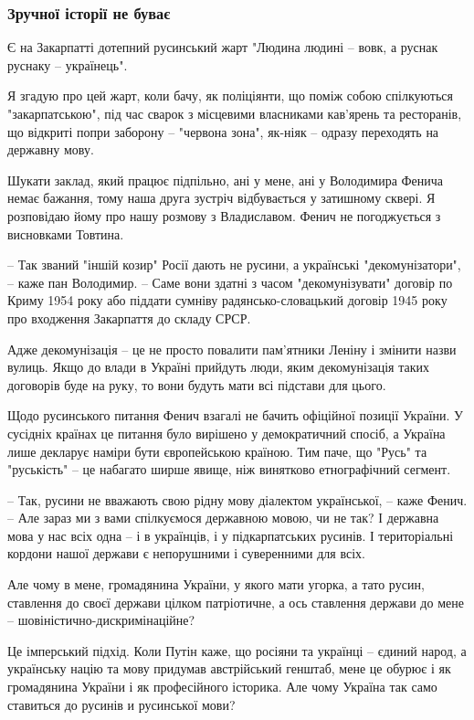 \subsubsection{Зручної історії не буває}

Є на Закарпатті дотепний русинський жарт "Людина людині – вовк, а руснак
руснаку – українець".

Я згадую про цей жарт, коли бачу, як поліціянти, що поміж собою спілкуються
"закарпатською", під час сварок з місцевими власниками кав’ярень та ресторанів,
що відкриті попри заборону – "червона зона", як-ніяк – одразу переходять на
державну мову.

Шукати заклад, який працює підпільно, ані у мене, ані у Володимира Фенича немає
бажання, тому наша друга зустріч відбувається у затишному сквері. Я розповідаю
йому про нашу розмову з Владиславом. Фенич не погоджується з висновками
Товтина.  

– Так званий "іншій козир" Росії дають не русини, а українські
"декомунізатори", – каже пан Володимир. – Саме вони здатні з часом
"декомунізувати" договір по Криму 1954 року або піддати сумніву
радянсько-словацький договір 1945 року про входження Закарпаття до складу СРСР.

Адже декомунізація – це не просто повалити пам’ятники Леніну і змінити назви
вулиць. Якщо до влади в Україні прийдуть люди, яким декомунізація таких
договорів буде на руку, то вони будуть мати всі підстави для цього.

Щодо русинського питання Фенич взагалі не бачить офіційної позиції України. У
сусідніх країнах це питання було вирішено у демократичний спосіб, а Україна
лише декларує наміри бути європейською країною. Тим паче, що "Русь" та
"руськість" – це набагато ширше явище, ніж винятково етнографічний сегмент.

– Так, русини не вважають свою рідну мову діалектом української, – каже Фенич.
– Але зараз ми з вами спілкуємося державною мовою, чи не так? І державна мова у
нас всіх одна – і в українців, і у підкарпатських русинів. І територіальні
кордони нашої держави є непорушними і суверенними для всіх.

Але чому в мене, громадянина України, у якого мати угорка, а тато русин,
ставлення до своєї держави цілком патріотичне, а ось ставлення держави до мене
– шовіністично-дискримінаційне?

Це імперський підхід. Коли Путін каже, що росіяни та українці – єдиний народ, а
українську націю та мову придумав австрійський генштаб, мене це обурює і як
громадянина України і як професійного історика. Але чому Україна так само
ставиться до русинів и русинської мови?

